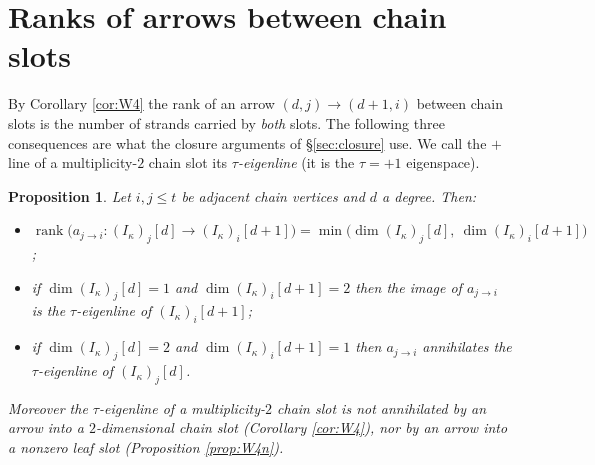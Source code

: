 \documentclass[reqno]{amsart}
\theoremstyle{plain}
\newtheorem{proposition}[theorem]{Proposition}
\theoremstyle{definition}
\newcommand{\ka}{\kappa}
\begin{document}
\section{Ranks of arrows between chain slots}\label{sec:T012}

By Corollary \ref{cor:W4} the rank of an arrow $(d,j)\to(d+1,i)$ between chain
slots is the number of strands carried by \emph{both} slots.  The following
three consequences are what the closure arguments of \S\ref{sec:closure} use.
We call the $+$ line of a multiplicity-$2$ chain slot its
\emph{$\tau$-eigenline} (it is the $\tau=+1$ eigenspace).

\begin{proposition}\label{prop:T012}
Let $i,j\le t$ be adjacent chain vertices and $d$ a degree.  Then:
\begin{itemize}\itemsep1pt
\item[\textup{(T0)}] $\operatorname{rank}\bigl(a_{j\to i}:(I_\ka)_j[d]\to
(I_\ka)_i[d+1]\bigr)=\min\bigl(\dim(I_\ka)_j[d],\ \dim(I_\ka)_i[d+1]\bigr)$;
\item[\textup{(T1)}] if $\dim(I_\ka)_j[d]=1$ and $\dim(I_\ka)_i[d+1]=2$ then
the image of $a_{j\to i}$ is the $\tau$-eigenline of $(I_\ka)_i[d+1]$;
\item[\textup{(T2)}] if $\dim(I_\ka)_j[d]=2$ and $\dim(I_\ka)_i[d+1]=1$ then
$a_{j\to i}$ annihilates the $\tau$-eigenline of $(I_\ka)_j[d]$.
\end{itemize}
Moreover the $\tau$-eigenline of a multiplicity-$2$ chain slot is \emph{not}
annihilated by an arrow into a $2$-dimensional chain slot \textup{(}Corollary
\ref{cor:W4}\textup{)}, nor by an arrow into a nonzero leaf slot
\textup{(}Proposition \ref{prop:W4n}\textup{)}.
\end{proposition}
\end{document}

